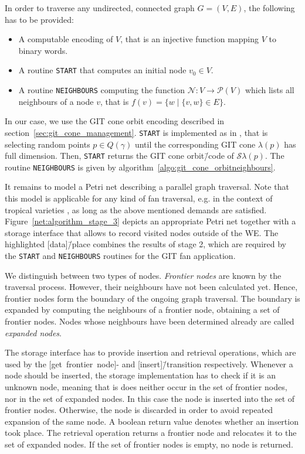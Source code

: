 
In order to traverse any undirected, connected graph $G=(V,E)$, the following has to be provided:

\begin{itemize}
	\item A computable encoding of $V$, that is an injective function mapping $V$ to binary words.
	\item A routine \texttt{START} that computes an initial node $v_0\in V$.
	\item A routine \texttt{NEIGHBOURS} computing the function $\mathcal{N}\colon V \rightarrow \mathcal{P}(V)$ which lists all neighbours of a node $v$, that is $f(v) = \{w \mid \{v,w\}\in E\}$.
\end{itemize}

In our case, we use the GIT cone orbit encoding described in section~\ref{sec:git_cone_management}. \texttt{START} is implemented as in \gitfanlib{}, that is selecting random points $p\in Q(\gamma)$ until the corresponding GIT cone $\lambda(p)$  has full dimension. Then, \texttt{START} returns the GIT cone orbit\=/code of $\mathcal{S}\lambda(p)$. The routine \texttt{NEIGHBOURS} is given by algorithm~\ref{algo:git_cone_orbitneighbours}.

It remains to model a Petri net describing a parallel graph traversal. Note that this model is applicable for any kind of fan traversal, e.g. in the context of tropical varieties , as long as the above mentioned demands are satisfied. Figure~\ref{net:algorithm_stage_3} depicts an appropriate Petri net together with a storage interface that allows to record visited nodes outside of the \ac{WE}. The highlighted [data]\=/place combines the results of stage 2, which are required by the \texttt{START} and \texttt{NEIGHBOURS} routines for the GIT fan application.



We distinguish between two types of nodes. \emph{Frontier nodes} are known by the traversal process. However, their neighbours have not been calculated yet. Hence, frontier nodes form the boundary of the ongoing graph traversal. The boundary is expanded by computing the neighbours of a frontier node, obtaining a set of frontier nodes. Nodes whose neighbours have been determined already are called \emph{expanded nodes}.

The storage interface has to provide insertion and retrieval operations, which are used by the [get~frontier~node]- and [insert]\=/transition respectively. Whenever a node should be inserted, the storage implementation has to check if it is an unknown node, meaning that is does neither occur in the set of frontier nodes, nor in the set of expanded nodes. In this case the node is inserted into the set of frontier nodes. Otherwise, the node is discarded in order to avoid repeated expansion of the same node. A boolean return value denotes whether an insertion took place. The retrieval operation returns a frontier node and relocates it to the set of expanded nodes. If the set of frontier nodes is empty, no node is returned.

